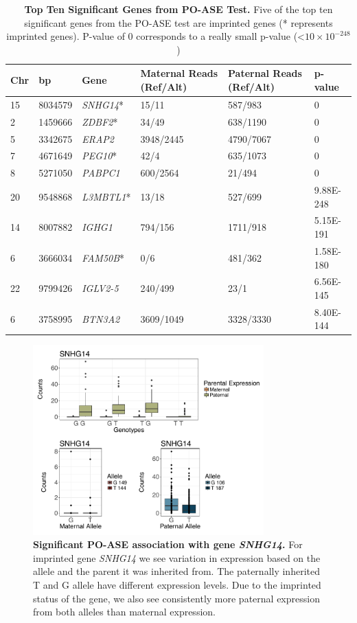\begin{table}[!htb]
\centering
\begin{adjustbox}{width={\textwidth}}
\begin{tabular}{@{}p{1cm}p{3cm}p{3cm}p{5cm}p{5cm}p{3cm}@{}}
 \toprule  Chr & bp & Gene & Maternal Reads (Ref/Alt) & Paternal Reads (Ref/Alt) & p-value \\ \midrule
15 & 8034579 & \emph{SNHG14}* & 15/11  & 587/983 & 0 \\
2 & 1459666  & \emph{ZDBF2}* & 34/49  & 638/1190 & 0\\
5 & 3342675 & \emph{ERAP2} & 3948/2445 & 4790/7067 & 0\\
7 & 4671649 &  \emph{PEG10}* & 42/4  & 635/1073 & 0 \\
8 & 5271050 & \emph{PABPC1} & 600/2564 & 21/494 & 0 \\
20 & 9548868 & \emph{L3MBTL1}* & 13/18 & 527/699 & 9.88E-248 \\
14 & 8007882 & \emph{IGHG1} &   794/156  & 1711/918 & 5.15E-191\\
6 & 3666034 & \emph{FAM50B}* & 0/6 & 481/362 & 1.58E-180\\
22 & 9799426 & \emph{IGLV2-5} & 240/499 & 23/1 & 6.56E-145\\
6 & 3758995 & \emph{BTN3A2} & 3609/1049  & 3328/3330 &  8.40E-144\\  \bottomrule
\end{tabular}
\end{adjustbox}
\caption[Top Ten Significant Genes from PO-ASE Test.]{\textbf{Top Ten Significant Genes from PO-ASE Test.} Five of the top ten significant genes from the PO-ASE test are imprinted genes (* represents imprinted genes). P-value of 0 corresponds to a really small p-value (\textless $10 \times 10^{-248} $)}
\label{tab:poase1}
\end{table}


\begin{figure}[!htb]
\centering \includegraphics[width=3.5in]{img/ch04/SNHG14.pdf}
\caption[Significant PO-ASE association with gene \emph{SNHG14}.]{\textbf{Significant PO-ASE association with gene \emph{SNHG14}.} For imprinted gene \emph{SNHG14} we see variation in expression based on the allele and the parent it was inherited from. The paternally inherited T and G allele have different expression levels. Due to the imprinted status of the gene, we also see consistently more paternal expression from both alleles than maternal expression.}
\label{fig:SNHG14}
\end{figure}

